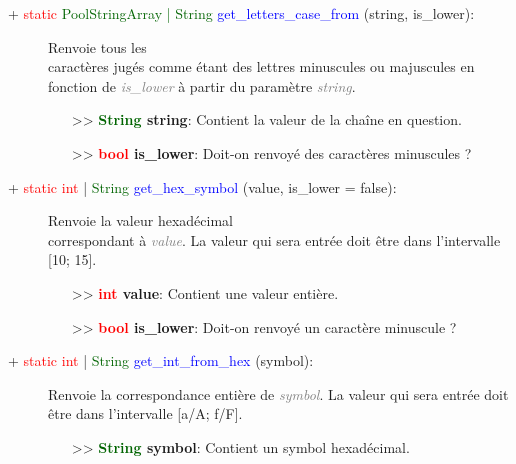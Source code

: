 \documentclass[a4paper, 11pt]{article}
\begin{document}
	\begin{description}
		\item [+ \textcolor{red}{static} \textcolor{darkgreen}{PoolStringArray | String} \textcolor{blue}
		{get\_letters\_case\_from} (string, is\_lower):] Renvoie tous les \\caractères jugés comme étant des 
		lettres minuscules ou majuscules en fonction de \textit{\textcolor{gray}{is\_lower}} à partir du
		paramètre \textit{\textcolor{gray}{string}}.
		\begin{itemize}
			\item [>> \textbf{\textcolor{darkgreen}{String} string}:] Contient la valeur de la chaîne en 
			question.
			\item [>> \textbf{\textcolor{red}{bool} is\_lower}:] Doit-on renvoyé des caractères minuscules ?
			\\
		\end{itemize}
	\end{description}
	\begin{description}
		\item [+ \textcolor{red}{static int} | \textcolor{darkgreen}{String} \textcolor{blue}
		{get\_hex\_symbol} (value, is\_lower = false):] Renvoie la valeur hexadécimal \\correspondant à 
		\textit{\textcolor{gray}{value}}. La valeur qui sera entrée doit être dans l'intervalle [10; 15].
		\begin{itemize}
			\item [>> \textbf{\textcolor{red}{int} value}:] Contient une valeur entière.
			\item [>> \textbf{\textcolor{red}{bool} is\_lower}:] Doit-on renvoyé un caractère minuscule ?\\
		\end{itemize}
	\end{description}
	\begin{description}
		\item [+ \textcolor{red}{static int} | \textcolor{darkgreen}{String} \textcolor{blue}
		{get\_int\_from\_hex} (symbol):] Renvoie la correspondance entière de \textit{\textcolor{gray}
		{symbol}}. La valeur qui sera entrée doit être dans l'intervalle [a/A; f/F].
		\begin{itemize}
			\item [>> \textbf{\textcolor{darkgreen}{String} symbol}:] Contient un symbol hexadécimal.\\
		\end{itemize}
	\end{description}
\end{document}
